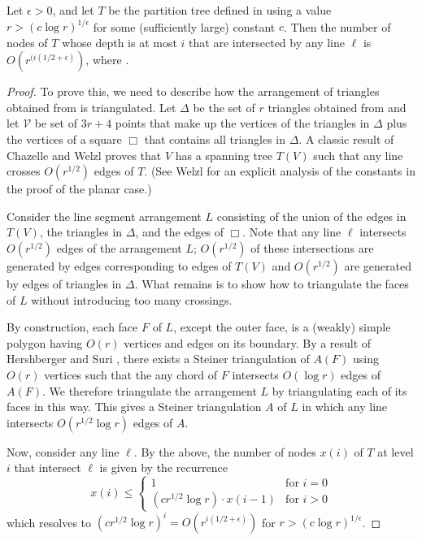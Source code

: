 \documentclass{patmorin}
\begin{document}
\begin{lem}
  Let $\epsilon > 0$, and let $T$ be the partition tree defined in
   using a value $r>(c\log r)^{1/\epsilon}$ for
  some (sufficiently large) constant $c$.  Then the number of nodes of
  $T$ whose depth is at most $i$ that are intersected by any line $\ell$
  is $O(r^{(i(1/2+\epsilon)})$, where .
\end{lem}

\begin{proof}
  To prove this, we need to describe how the arrangement of triangles
  obtained from  is triangulated.  Let $\Delta$
  be the set of $r$ triangles obtained from  and
  let $\mathcal{V}$ be set of $3r+4$ points that make up the vertices
  of the triangles in $\Delta$ plus the vertices of a square $\Box$ that
  contains all triangles in $\Delta$.  A classic result of Chazelle and
  Welzl \cite{cw89} proves that $V$ has a spanning tree $T(V)$ such that
  any line crosses $O(r^{1/2})$ edges of $T$. (See Welzl \cite{wXX} for
  an explicit analysis of the constants in the proof of the planar case.)

  Consider the line segment arrangement $L$ consisting of the union of the
  edges in $T(V)$, the triangles in $\Delta$, and the edges of $\Box$.
  Note that any line $\ell$  intersects $O(r^{1/2})$ edges of the
  arrangement $L$; $O(r^{1/2})$ of these intersections are generated by
  edges corresponding to edges of $T(V)$ and $O(r^{1/2})$ are generated
  by edges of triangles in $\Delta$.  What remains is to show how to
  triangulate the faces of $L$ without introducing too many crossings.

  By construction, each face $F$ of $L$, except the outer face, is a
  (weakly) simple polygon having $O(r)$ vertices and edges on its
  boundary.  By a result of Hershberger and Suri \cite{hs95}, there
  exists a Steiner triangulation of $A(F)$ using $O(r)$ vertices such
  that the any chord of $F$ intersects $O(\log r)$ edges of $A(F)$. We
  therefore triangulate the arrangement $L$ by triangulating each of
  its faces in this way.  This gives a Steiner triangulation $A$ of $L$
  in which any line intersects $O(r^{1/2}\log r)$ edges of $A$.

  Now, consider any line $\ell$. By the above, the number of nodes
  $x(i)$ of $T$ at level $i$ that intersect $\ell$ is given by
  the recurrence
  \[
     x(i)\le 
      \left\{
       \begin{array}{ll}
          1 & \mbox{for $i=0$} \\
          (cr^{1/2}\log r)\cdot x(i-1) & \mbox{for $i>0$}
       \end{array}
      \right.
\]
which resolves to $(cr^{1/2}\log r)^i= O(r^{i(1/2+\epsilon)})$ for 
$r>(c\log r)^{1/\epsilon}$.
\end{proof}
\end{document}
